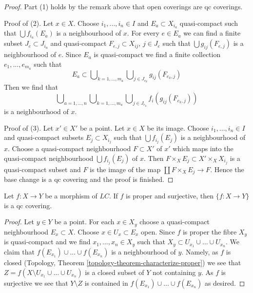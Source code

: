 \begin{proof}
Part (1) holds by the remark above that open coverings are qc coverings.

\medskip\noindent
Proof of (2). Let $x \in X$. Choose $i_1, \ldots, i_n \in I$ and
$E_a \subset X_{i_a}$ quasi-compact such that $\bigcup f_{i_a}(E_a)$
is a neighbourhood of $x$. For every $e \in E_a$ we can find
a finite subset $J_e \subset J_{i_a}$ and quasi-compact
$F_{e, j} \subset X_{ij}$, $j \in J_e$ such that $\bigcup g_{ij}(F_{e, j})$
is a neighbourhood of $e$. Since $E_a$ is quasi-compact we find
a finite collection $e_1, \ldots, e_{m_a}$ such that
$$
E_a \subset
\bigcup\nolimits_{k = 1, \ldots, m_a}
\bigcup\nolimits_{j \in J_{e_k}} g_{ij}(F_{e_k, j})
$$
Then we find that
$$
\bigcup\nolimits_{a = 1, \ldots, n}
\bigcup\nolimits_{k = 1, \ldots, m_a}
\bigcup\nolimits_{j \in J_{e_k}} f_i(g_{ij}(F_{e_k, j}))
$$
is a neighbourhood of $x$.

\medskip\noindent
Proof of (3). Let $x' \in X'$ be a point. Let $x \in X$ be its image.
Choose $i_1, \ldots, i_n \in I$ and quasi-compact subsets
$E_j \subset X_{i_j}$ such that $\bigcup f_{i_j}(E_j)$ is a
neighbourhood of $x$. Choose a quasi-compact neighbourhood $F \subset X'$
of $x'$ which maps into the quasi-compact neighbourhood
$\bigcup f_{i_j}(E_j)$ of $x$. Then
$F \times_X E_j \subset X' \times_X X_{i_j}$ is a
quasi-compact subset and $F$ is the image of the map
$\coprod F \times_X E_j \to F$. Hence the base change is a
qc covering and the proof is finished.
\end{proof}

\begin{lemma}
\label{lemma-proper-surjective-is-qc-covering}
Let $f : X \to Y$ be a morphism of $\textit{LC}$.
If $f$ is proper and surjective, then $\{f : X \to Y\}$
is a qc covering.
\end{lemma}

\begin{proof}
Let $y \in Y$ be a point. For each $x \in X_y$ choose a quasi-compact
neighbourhood $E_x \subset X$. Choose $x \in U_x \subset E_x$ open.
Since $f$ is proper the fibre $X_y$ is quasi-compact and we find
$x_1, \ldots, x_n \in X_y$ such that
$X_y \subset U_{x_1} \cup \ldots \cup U_{x_n}$.
We claim that $f(E_{x_1}) \cup \ldots \cup f(E_{x_n})$ is a neighbourhood of
$y$. Namely, as $f$ is closed
(Topology, Theorem \ref{topology-theorem-characterize-proper})
we see that $Z = f(X \setminus U_{x_1} \cup \ldots \cup U_{x_n})$
is a closed subset of $Y$ not containing $y$. As $f$ is surjective
we see that $Y \setminus Z$ is contained in
$f(E_{x_1}) \cup \ldots \cup f(E_{x_n})$ as desired.
\end{proof}

